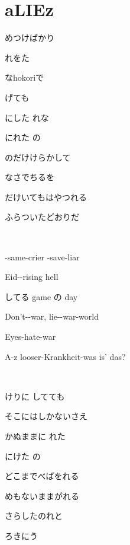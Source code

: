\documentclass[12pt,a4paper]{article}
\begin{document}
\fontsize{16pt}{20pt}\selectfont
\centering

\section{aLIEz}

めつけばかり

れをた

なhokoriで

げても

にした れな

にれた の

のだけけらかして

なさでちるを

だけいてもはやつれる

ふらついたどおりだ

~

-same-crier -save-liar

Eid--rising hell

してる game の day

Don't--war, lie--war-world

Eyes-hate-war

A-z looser-Krankheit-was is' das?

~

けりに してても

そこにはしかないさえ

かぬままに れた

にけた の

どこまでべばをれる

めもないままがれる

さらしたのれと

ろきにう
\end{document}
